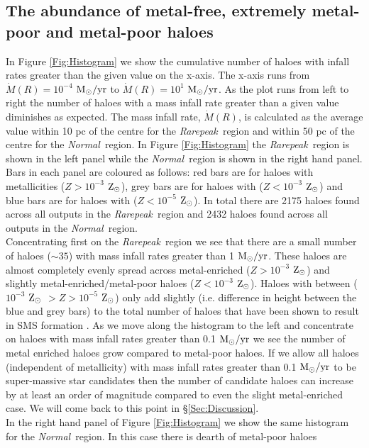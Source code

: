 \documentclass[graphics, twocolumn, usenatbib]{mn2e}
\newcommand{\msolaryr} {$\rm{M_{\odot}/yr}~$}
\newcommand{\msolaryrc} {$\rm{M_{\odot}/yr}$}
\newcommand{\zsolar} {$\rm{Z_{\odot}}~$}
\newcommand{\zsolarc} {$\rm{Z_{\odot}}$}
\newcommand{\rarepeak} {\textit{Rarepeak~}}
\newcommand{\normal} {\textit{Normal~}}
\begin{document}
\subsection{The abundance of metal-free, extremely metal-poor and metal-poor haloes}
In Figure \ref{Fig:Histogram} we show the cumulative number of haloes with infall rates greater than
the given value on the x-axis. The x-axis runs from $\dot{M}(R) = 10^{-4}$ \msolaryr to 
$\dot{M}(R) = 10^{1}$ \msolaryrc. As the plot runs from left to right the number of haloes with a
mass infall rate greater than a given value diminishes as expected. The mass infall rate,
$\dot{M}(R)$, is calculated as the average value within 10 pc of the centre for the \rarepeak region
and within 50 pc of the centre for the \normal region. In Figure  \ref{Fig:Histogram} the
\rarepeak region is shown in the left panel while the \normal region is shown in the right hand
panel. Bars in each panel are coloured as follows: red bars are for haloes with metallicities
($Z > 10^{-3}$ \zsolarc), grey bars are for haloes with ($Z < 10^{-3}$ \zsolarc) and blue bars are for
haloes with ($Z < 10^{-5}$ \zsolarc). In total there are 2175 haloes found across all outputs in
the \rarepeak region and 2432 haloes found across all outputs in the \normal region. \\
\indent Concentrating first on the \rarepeak region we see that there are a small number of
haloes ($\sim 35$) with mass infall rates greater than 1 \msolaryrc. These haloes are almost
completely evenly spread across metal-enriched ($Z > 10^{-3}$ \zsolarc) and
slightly metal-enriched/metal-poor haloes ($Z < 10^{-3}$ \zsolarc). Haloes with between
($10^{-3}$ \zsolar $> Z > 10^{-5}$ \zsolarc) only add slightly (i.e. difference in height between the
blue and grey bars) to the total number of haloes that
have been shown to result in SMS formation \citep{Chon_2020}. As we move along the histogram to the
left and concentrate on haloes with mass infall rates greater than 0.1 \msolaryr we see the
number of metal enriched haloes grow compared to
metal-poor haloes. If we allow all haloes (independent of metallicity) with mass infall rates greater
than  0.1 \msolaryr to be super-massive star candidates then the number of candidate haloes can
increase by at least an order of magnitude compared to even the slight metal-enriched case. We will
come back to this point in \S \ref{Sec:Discussion}. \\
\indent In the right hand panel of Figure \ref{Fig:Histogram}
we show the same histogram for the \normal region. In this case there is dearth of metal-poor haloes
\end{document}
